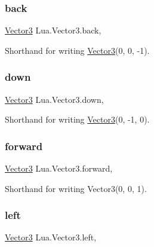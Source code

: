 \subsubsection{\texorpdfstring{back}{back}}
{\footnotesize\ttfamily \mbox{\hyperlink{class_lua_1_1_vector3}{Vector3}} Lua.\+Vector3.\+back\hspace{0.3cm}{\ttfamily [static]}, {\ttfamily [get]}}



Shorthand for writing \mbox{\hyperlink{class_lua_1_1_vector3}{Vector3}}(0, 0, -\/1). 

\mbox{\label{class_lua_1_1_vector3_adfb20fbfe1e5224b0b0fade3da0d4c8f}} 
\subsubsection{\texorpdfstring{down}{down}}
{\footnotesize\ttfamily \mbox{\hyperlink{class_lua_1_1_vector3}{Vector3}} Lua.\+Vector3.\+down\hspace{0.3cm}{\ttfamily [static]}, {\ttfamily [get]}}



Shorthand for writing \mbox{\hyperlink{class_lua_1_1_vector3}{Vector3}}(0, -\/1, 0). 

\mbox{\label{class_lua_1_1_vector3_ad8be15240d9bfa336d926ab023f11ad4}} 
\subsubsection{\texorpdfstring{forward}{forward}}
{\footnotesize\ttfamily \mbox{\hyperlink{class_lua_1_1_vector3}{Vector3}} Lua.\+Vector3.\+forward\hspace{0.3cm}{\ttfamily [static]}, {\ttfamily [get]}}



Shorthand for writing Vector3(0, 0, 1). 

\mbox{\label{class_lua_1_1_vector3_a5a08c13ed00efb9fb6728fded1e8a472}} 
\subsubsection{\texorpdfstring{left}{left}}
{\footnotesize\ttfamily \mbox{\hyperlink{class_lua_1_1_vector3}{Vector3}} Lua.\+Vector3.\+left\hspace{0.3cm}{\ttfamily [static]}, {\ttfamily [get]}}




